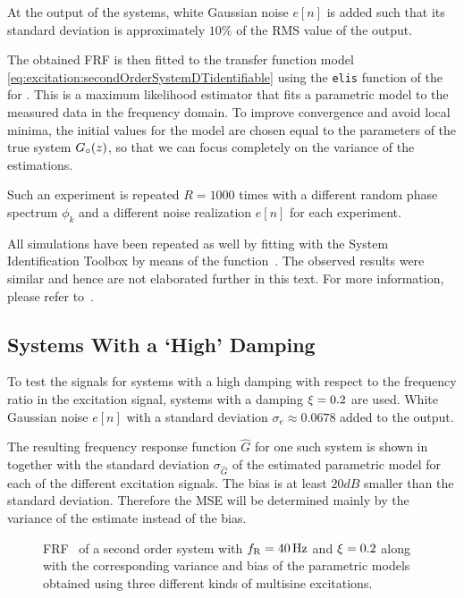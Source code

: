   At the output of the systems, white Gaussian noise $e[n]$ is added such that its standard deviation is approximately $10\%$ of the RMS value of the output.

  
  The obtained FRF is then fitted to the transfer function model \eqref{eq:excitation:secondOrderSystemDTidentifiable} using the \texttt{elis} function of the \FDIDENT~\citep{FDIDENT} for \MATLAB.
  This is a maximum likelihood estimator that fits a parametric model to the measured data in the frequency domain.
  To improve convergence and avoid local minima, the initial values for the model are chosen equal to the parameters of the true system ${G}_{\circ}(z)$, so that we can focus completely on the variance of the estimations.

  Such an experiment is repeated $R=1000$ times with a different random phase  spectrum $\phi_k$ and a different noise realization $e[n]$ for each experiment.

  \begin{remark}
  All simulations  have been repeated as well by fitting with the \MATLAB System Identification Toolbox by means of the  function~\citep{TDIDENT}.
  The observed results were similar and hence are not elaborated further in this text.
  For more information, please refer to~\citet{Larsson2012SYSID}.
  \end{remark}

  \subsection{Systems With a `High' Damping}
  To test the signals for systems with a high damping with respect to the frequency ratio in the excitation signal, systems with a damping $\xi_{} = 0.2$ are used.
  White Gaussian noise $e[n]$ with a standard deviation $\sigma_e \approx 0.0678$ added to the output.

  The resulting frequency response function $\hat{G}$ for one such system is shown in  together with the standard deviation $\sigma_{\hat{G}}$ of the estimated parametric model for each of the different excitation signals.
  The bias is at least $20\unit{dB}$ smaller than the standard  deviation.
  Therefore the \gls{MSE} will be determined mainly by the variance of the estimate instead of the bias.

  \begin{figure}[th]
    \centering
      \setlength{}
      \setlength\figureheight{0.68\figurewidth}
    
    \caption[Simulated  of a single system using different excitation signals.]{\gls{FRF}~ of a second order system with $f_{\mathrm{R}}=40\,\mathrm{Hz}$ and $\xi_{}=0.2$ along with the corresponding variance and bias of the parametric models obtained using three different kinds of multisine excitations.}%
    \label{fig:excitation:FRF1}
  \end{figure}

